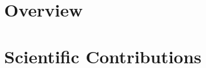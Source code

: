 \documentclass[12pt]{book} %
\begin{document}
\mainmatter
%
%
\part{\color{Maroon} Overview}
\label{part:1}



%
%



\part{\color{Maroon} Scientific Contributions}
\label{part:2}


\newpage
\listoffigures

\let\cleardoublepage\clearpage

\newpage
\lstlistoflistings

\let\cleardoublepage\clearpage

\newpage
\listoftables

\backmatter
\end{document}
